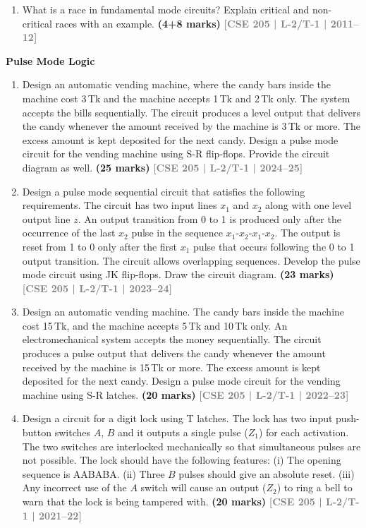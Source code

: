 \documentclass[12pt]{article}
\newcommand{\yr}[1]{\hfill\textcolor{gray}{\small\textbf{[#1]}}}
\newcommand{\mk}[1]{\textcolor{orange!70!black}{\small\textbf{(#1 marks)}}}
\newcounter{subtopicbm}
\newcommand{\subtopic}[2]{%
  \stepcounter{subtopicbm}%
  \pdfbookmark[2]{#2}{subtopicbm.\thesubtopicbm}%
  \vspace{10pt}
  \noindent\begin{tcolorbox}[colback=#1!8,colframe=#1,boxrule=0.6pt,arc=4pt,
    left=6pt,right=6pt,top=4pt,bottom=4pt]
    \small\bfseries\textcolor{#1}{#2}
  \end{tcolorbox}
  \vspace{2pt}
}
\begin{document}
\begin{enumerate}
\mk{10} \yr{CSE 205 | L-2/T-1 | 2014--15}

\item What is a race in fundamental mode circuits? Explain critical and non-critical races with an example.
\mk{4+8} \yr{CSE 205 | L-2/T-1 | 2011--12}

\end{enumerate}

\subtopic{cF}{Pulse Mode Logic}
\label{sub:s6-pulse}

\begin{enumerate}

\item Design an automatic vending machine, where the candy bars inside the machine cost 3\,Tk and the machine accepts 1\,Tk and 2\,Tk only. The system accepts the bills sequentially. The circuit produces a level output that delivers the candy whenever the amount received by the machine is 3\,Tk or more. The excess amount is kept deposited for the next candy. Design a pulse mode circuit for the vending machine using S-R flip-flops. Provide the circuit diagram as well.
\mk{25} \yr{CSE 205 | L-2/T-1 | 2024--25}

\item Design a pulse mode sequential circuit that satisfies the following requirements. The circuit has two input lines $x_1$ and $x_2$ along with one level output line $z$. An output transition from 0 to 1 is produced only after the occurrence of the last $x_2$ pulse in the sequence $x_1\text{-}x_2\text{-}x_1\text{-}x_2$. The output is reset from 1 to 0 only after the first $x_1$ pulse that occurs following the 0 to 1 output transition. The circuit allows overlapping sequences. Develop the pulse mode circuit using JK flip-flops. Draw the circuit diagram.
\mk{23} \yr{CSE 205 | L-2/T-1 | 2023--24}

\item Design an automatic vending machine. The candy bars inside the machine cost 15\,Tk, and the machine accepts 5\,Tk and 10\,Tk only. An electromechanical system accepts the money sequentially. The circuit produces a pulse output that delivers the candy whenever the amount received by the machine is 15\,Tk or more. The excess amount is kept deposited for the next candy. Design a pulse mode circuit for the vending machine using S-R latches.
\mk{20} \yr{CSE 205 | L-2/T-1 | 2022--23}

\item Design a circuit for a digit lock using T latches. The lock has two input push-button switches $A$, $B$ and it outputs a single pulse ($Z_1$) for each activation. The two switches are interlocked mechanically so that simultaneous pulses are not possible. The lock should have the following features: (i) The opening sequence is AABABA. (ii) Three $B$ pulses should give an absolute reset. (iii) Any incorrect use of the $A$ switch will cause an output ($Z_2$) to ring a bell to warn that the lock is being tampered with.
\mk{20} \yr{CSE 205 | L-2/T-1 | 2021--22}


\end{enumerate}
\end{document}
